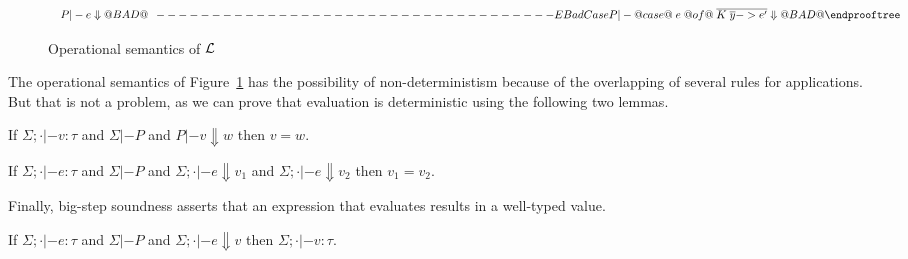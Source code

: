 \begin{figure}
\[\begin{array}{c}
\begin{array}{c}
P |- e \Downarrow @BAD@ \\
\end{array}
------------------------------------{EBadCase}
P |- @case@\;e\;@of@\;\ol{K\;\ol{y} -> e'} \Downarrow @BAD@
\endprooftree
\end{array}\]
\caption{Operational semantics of $\cal L$}\label{fig:opsem}
\end{figure}
The operational semantics of Figure~\ref{fig:opsem} has the possibility of non-deterministism because
of the overlapping of several rules for applications. But that is not a problem, as we can prove that evaluation 
is deterministic using the following two lemmas.
\begin{lemma}
If $\Sigma;\cdot |- v : \tau$ and 
$\Sigma |- P$ and $P |- v \Downarrow w$ then $ v = w $.
\end{lemma}
\begin{lemma}
If $\Sigma;\cdot |- e : \tau$ and 
$\Sigma |- P$ and $\Sigma;\cdot |- e \Downarrow v_1$ and $\Sigma;\cdot |- e \Downarrow v_2$ then
$v_1 = v_2$.
\end{lemma}
Finally, big-step soundness asserts that an expression that evaluates results in a
well-typed value.
\begin{lemma}
If $\Sigma;\cdot |- e : \tau$ and 
$\Sigma |- P$ and $\Sigma;\cdot |- e \Downarrow v$ then $\Sigma;\cdot |- v : \tau$.
\end{lemma}


